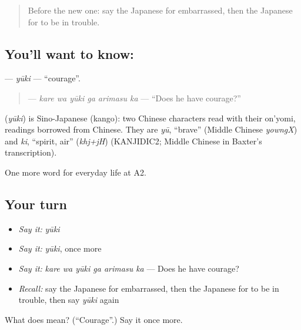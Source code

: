 \label{lesson:JA-C247-yuuki}



\begin{quote}
Before the new one: say the Japanese for embarrassed, then the Japanese for to be in trouble.
\end{quote}

\subsection*{You'll want to know: }
\textbf{} — \emph{yūki} — \textquotedblleft{}courage\textquotedblright{}.

\begin{quote}
\textbf{  } — \emph{kare wa yūki ga arimasu ka} — \textquotedblleft{}Does he have courage?\textquotedblright{}
\end{quote}

\begin{cousinweb}
\textbf{} (\emph{yūki}) is Sino-Japanese (kango): two Chinese characters read with their on'yomi, readings borrowed from Chinese. They are \emph{yū}, \textquotedblleft{}brave\textquotedblright{} (Middle Chinese \emph{yowngX}) and \emph{ki}, \textquotedblleft{}spirit, air\textquotedblright{} (\emph{khj+jH}) (KANJIDIC2; Middle Chinese in Baxter's transcription).
\end{cousinweb}

\begin{grammarlens}[title={What you've built}]
One more word for everyday life at A2.
\end{grammarlens}

\subsection*{Your turn}
\begin{itemize}
\raggedright
  \item \emph{Say it:} \emph{yūki}
  \item \emph{Say it:} \emph{yūki}, once more
  \item \emph{Say it:} \emph{kare wa yūki ga arimasu ka} — Does he have courage?
  \item \emph{Recall:} say the Japanese for embarrassed, then the Japanese for to be in trouble, then say \emph{yūki} again
\end{itemize}

\begin{tcolorbox}[breakable,colback=teal!4,colframe=teal!35!black,title={Before you move on}]
What does  mean? (\textquotedblleft{}Courage\textquotedblright{}.) Say it once more.
\end{tcolorbox}
